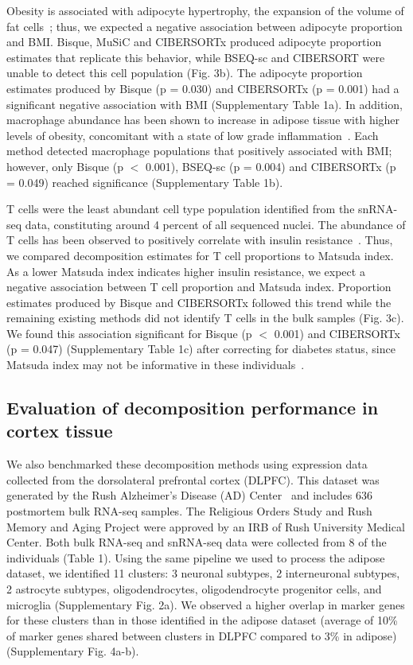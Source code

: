 Obesity is associated with adipocyte hypertrophy, the expansion of the volume of fat cells~\cite{Spalding2008-ey}; thus, we expected a negative association between adipocyte proportion and BMI. Bisque, MuSiC and CIBERSORTx produced adipocyte proportion estimates that replicate this behavior, while BSEQ-sc and CIBERSORT were unable to detect this cell population (Fig. 3b). The adipocyte proportion estimates produced by Bisque (p = 0.030) and CIBERSORTx (p = 0.001) had a significant negative association with BMI (Supplementary Table 1a). In addition, macrophage abundance has been shown to increase in adipose tissue with higher levels of obesity, concomitant with a state of low grade inflammation~\cite{Weisberg2003-hx}. Each method detected macrophage populations that positively associated with BMI; however, only Bisque (p $<$ 0.001), BSEQ-sc (p = 0.004) and CIBERSORTx (p = 0.049) reached significance (Supplementary Table 1b). 

T cells were the least abundant cell type population identified from the snRNA-seq data, constituting around 4 percent of all sequenced nuclei. The abundance of T cells has been observed to positively correlate with insulin resistance~\cite{McLaughlin2014-gn}. Thus, we compared decomposition estimates for T cell proportions to Matsuda index. As a lower Matsuda index indicates higher insulin resistance, we expect a negative association between T cell proportion and Matsuda index. Proportion estimates produced by Bisque and CIBERSORTx followed this trend while the remaining existing methods did not identify T cells in the bulk samples (Fig. 3c). We found this association significant for Bisque (p $<$ 0.001) and CIBERSORTx (p = 0.047) (Supplementary Table 1c) after correcting for diabetes status, since Matsuda index may not be informative in these individuals~\cite{Gutch2015-db}. 

\subsection{Evaluation of decomposition performance in cortex tissue}

We also benchmarked these decomposition methods using expression data collected from the dorsolateral prefrontal cortex (DLPFC). This dataset was generated by the Rush Alzheimer’s Disease (AD) Center~\cite{Mostafavi2018-ch}  and includes 636 postmortem bulk RNA-seq samples.  The Religious Orders Study and Rush Memory and Aging Project were approved by an IRB of Rush University Medical Center. Both bulk RNA-seq and snRNA-seq data were collected from 8 of the individuals (Table 1). Using the same pipeline we used to process the adipose dataset, we identified 11 clusters: 3 neuronal subtypes, 2 interneuronal subtypes, 2 astrocyte subtypes, oligodendrocytes, oligodendrocyte progenitor cells, and microglia (Supplementary Fig. 2a). We observed a higher overlap in marker genes for these clusters than in those identified in the adipose dataset (average of 10\% of marker genes shared between clusters in DLPFC compared to 3\% in adipose) (Supplementary Fig. 4a-b).	
 	
